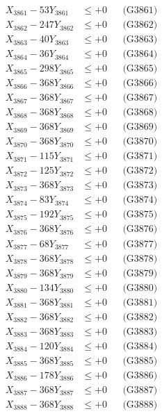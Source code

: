 \documentclass[a4paper,10pt]{article}
\begin{document}
{\begin{align}
\allowbreak
X_{3861} - 53Y_{3861} &\leq +0 && \text{(G3861)} \\
X_{3862} - 247Y_{3862} &\leq +0 && \text{(G3862)} \\
X_{3863} - 40Y_{3863} &\leq +0 && \text{(G3863)} \\
X_{3864} - 36Y_{3864} &\leq +0 && \text{(G3864)} \\
X_{3865} - 298Y_{3865} &\leq +0 && \text{(G3865)} \\
X_{3866} - 368Y_{3866} &\leq +0 && \text{(G3866)} \\
X_{3867} - 368Y_{3867} &\leq +0 && \text{(G3867)} \\
X_{3868} - 368Y_{3868} &\leq +0 && \text{(G3868)} \\
X_{3869} - 368Y_{3869} &\leq +0 && \text{(G3869)} \\
X_{3870} - 368Y_{3870} &\leq +0 && \text{(G3870)} \\
\allowbreak
X_{3871} - 115Y_{3871} &\leq +0 && \text{(G3871)} \\
X_{3872} - 125Y_{3872} &\leq +0 && \text{(G3872)} \\
X_{3873} - 368Y_{3873} &\leq +0 && \text{(G3873)} \\
X_{3874} - 83Y_{3874} &\leq +0 && \text{(G3874)} \\
X_{3875} - 192Y_{3875} &\leq +0 && \text{(G3875)} \\
X_{3876} - 368Y_{3876} &\leq +0 && \text{(G3876)} \\
X_{3877} - 68Y_{3877} &\leq +0 && \text{(G3877)} \\
X_{3878} - 368Y_{3878} &\leq +0 && \text{(G3878)} \\
X_{3879} - 368Y_{3879} &\leq +0 && \text{(G3879)} \\
X_{3880} - 134Y_{3880} &\leq +0 && \text{(G3880)} \\
\allowbreak
X_{3881} - 368Y_{3881} &\leq +0 && \text{(G3881)} \\
X_{3882} - 368Y_{3882} &\leq +0 && \text{(G3882)} \\
X_{3883} - 368Y_{3883} &\leq +0 && \text{(G3883)} \\
X_{3884} - 120Y_{3884} &\leq +0 && \text{(G3884)} \\
X_{3885} - 368Y_{3885} &\leq +0 && \text{(G3885)} \\
X_{3886} - 178Y_{3886} &\leq +0 && \text{(G3886)} \\
X_{3887} - 368Y_{3887} &\leq +0 && \text{(G3887)} \\
X_{3888} - 368Y_{3888} &\leq +0 && \text{(G3888)} \\

\end{align}}
\end{document}
